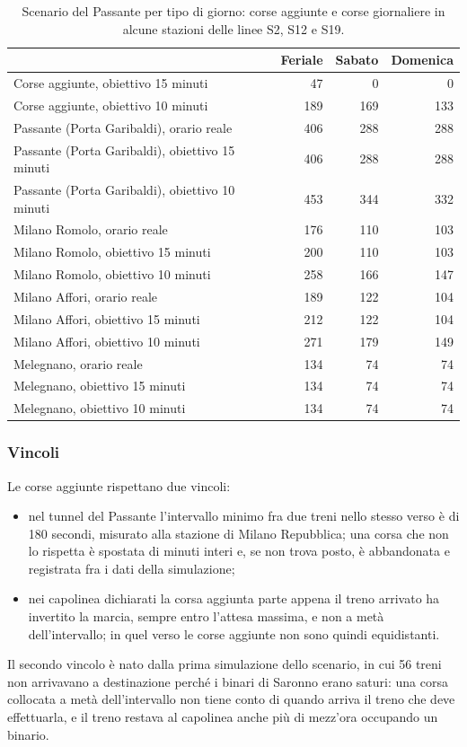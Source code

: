 \begin{table}[H]
	\centering
	\caption{Scenario del Passante per tipo di giorno: corse aggiunte e corse giornaliere in alcune stazioni delle linee S2, S12 e S19.}
	\label{tab:scenari-giorni}
	\begin{tabularx}{\textwidth}{>{\raggedright\arraybackslash}Xrrr}
		\toprule
		 & Feriale & Sabato & Domenica \\
		\midrule
		Corse aggiunte, obiettivo 15 minuti & 47 & 0 & 0 \\
		Corse aggiunte, obiettivo 10 minuti & 189 & 169 & 133 \\
		\midrule
		Passante (Porta Garibaldi), orario reale & 406 & 288 & 288 \\
		Passante (Porta Garibaldi), obiettivo 15 minuti & 406 & 288 & 288 \\
		Passante (Porta Garibaldi), obiettivo 10 minuti & 453 & 344 & 332 \\
		\addlinespace
		Milano Romolo, orario reale & 176 & 110 & 103 \\
		Milano Romolo, obiettivo 15 minuti & 200 & 110 & 103 \\
		Milano Romolo, obiettivo 10 minuti & 258 & 166 & 147 \\
		\addlinespace
		Milano Affori, orario reale & 189 & 122 & 104 \\
		Milano Affori, obiettivo 15 minuti & 212 & 122 & 104 \\
		Milano Affori, obiettivo 10 minuti & 271 & 179 & 149 \\
		\addlinespace
		Melegnano, orario reale & 134 & 74 & 74 \\
		Melegnano, obiettivo 15 minuti & 134 & 74 & 74 \\
		Melegnano, obiettivo 10 minuti & 134 & 74 & 74 \\
		\bottomrule
	\end{tabularx}
\end{table}

\subsubsection{Vincoli}
Le corse aggiunte rispettano due vincoli:
\begin{itemize}
	\item nel tunnel del Passante l'intervallo minimo fra due treni nello stesso verso è di 180 secondi, misurato alla stazione di Milano Repubblica; una corsa che non lo rispetta è spostata di minuti interi e, se non trova posto, è abbandonata e registrata fra i dati della simulazione;
	\item nei capolinea dichiarati la corsa aggiunta parte appena il treno arrivato ha invertito la marcia, sempre entro l'attesa massima, e non a metà dell'intervallo; in quel verso le corse aggiunte non sono quindi equidistanti.
\end{itemize}
Il secondo vincolo è nato dalla prima simulazione dello scenario, in cui 56 treni non arrivavano a destinazione perché i binari di Saronno erano saturi: una corsa collocata a metà dell'intervallo non tiene conto di quando arriva il treno che deve effettuarla, e il treno restava al capolinea anche più di mezz'ora occupando un binario.

